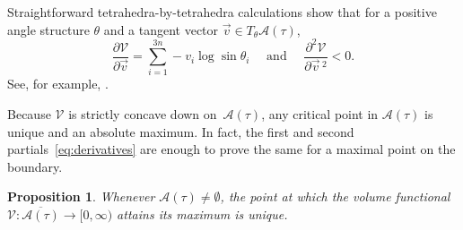 \documentclass[reqno]{amsart}
\theoremstyle{plain}
\newtheorem{prop}[thm]{Proposition}
\theoremstyle{definition}
\begin{document}
Straightforward tetrahedra-by-tetrahedra calculations show that for a positive angle structure $\theta$ and a tangent vector $\vec v\in T_\theta\mathcal{A}(\tau)$,
\begin{equation}
    \frac{\partial\mathcal{V}}{\partial \vec v}=\displaystyle{\sum_{i=1}^{3n} -v_i\log \sin \theta_i} \quad\text{ and }\quad\frac{\partial^2\mathcal{V}}{\partial \vec v\, ^2}<0.\label{eq:derivatives}
\end{equation}
See, for example, \cite[Lemma 5.3]{AngledtoHyperbolic}.

Because $\mathcal{V}$ is strictly concave down on~$\mathcal A(\tau)$, any critical point in $\mathcal{A}(\tau)$ is unique and an absolute maximum.  In fact, the first and second partials~\eqref{eq:derivatives} are enough to prove the same for a maximal point on the boundary. 

\begin{prop}\label{prop:maxunique}
Whenever $\mathcal{A}(\tau)\ne\emptyset$, the point at which the volume functional $\mathcal V: \overline{\mathcal A(\tau)}\rightarrow[0,\infty)$ attains its maximum is unique.
\end{prop}
\end{document}
